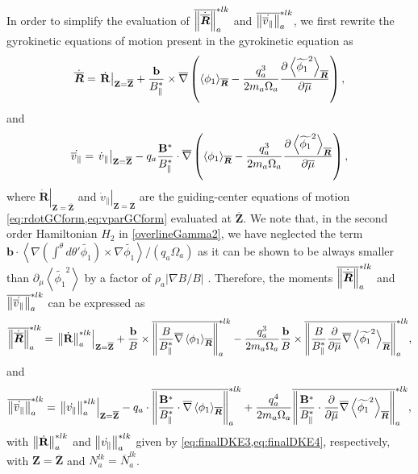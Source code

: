 In order to simplify the evaluation of ${\ovmomentstar{lk}{\dot \gyR}}$ and ${\ovmomentstar{lk}{\dot{\overline v_\parallel}}}$, we first rewrite the gyrokinetic equations of motion present in the gyrokinetic equation as
%
\begin{equation}
    \dot \gyR = \left.\dot{\mathbf R}\right|_{\mathbf Z=\overline{\mathbf Z}}+\frac{\mathbf b}{B_\parallel^*}\times \overline \nabla \left(\gyaver{ \phi_1}_{\gyR}-\frac{q_a^3}{2  m_a \Omega_a } \frac{\partial \left< \widetilde{\phi_1}^2 \right>_{\gyR}}{\partial \overline \mu}\right),
\end{equation}
%
and
%
\begin{equation}
    \dot \gyvparallel = \left.\dot v_{\parallel}\right|_{\mathbf Z=\overline{\mathbf Z}} - q_a\frac{\mathbf B^*}{B_\parallel^*}\cdot \overline \nabla  \left(\gyaver{ \phi_1}_{\gyR}-\frac{q_a^3}{2  m_a \Omega_a } \frac{\partial \left< \widetilde{\phi_1}^2 \right>_{\gyR}}{\partial \overline \mu}\right),
\end{equation}
%
where $\left.\dot{\mathbf R}\right|_{\mathbf Z=\overline{\mathbf Z}}$ and $\left.\dot v_{\parallel}\right|_{\mathbf Z=\overline{\mathbf Z}}$ are the guiding-center equations of motion \cref{eq:rdotGCform,eq:vparGCform} evaluated at $\overline{\mathbf Z}$.
%
We note that, in the second order Hamiltonian $H_2$ in \cref{overlineGamma2}, we have neglected the term 
${\bm b}\cdot\left<\nabla \left(\int^\theta d \theta'\widetilde{\phi_1}\right)\times \nabla \widetilde{\phi_1}\right>/({q_a \Omega_a})$ as it can be shown to be always smaller than ${\partial_\mu \left< \widetilde{\phi_1}^2\right>}$ by a factor of $\rho_a |\nabla B/B|$ \citep{Hahm2009}.
%
Therefore, the moments ${\ovmomentstar{lk}{\dot \gyR}}$ and ${\ovmomentstar{lk}{\dot{\overline v_\parallel}}}$ can be expressed as
%
\begin{equation}
    \ovmomentstar{lk}{\dot \gyR} = \left.\momentstar{lk}{\dot{\mathbf R}}\right|_{\mathbf Z=\overline{\mathbf Z}}+ \frac{\mathbf b}{B}\times\ovmomentstar{lk}{\frac{B}{B_\parallel^*} \overline \nabla\gyaver{ \phi_1}_{\gyR}}-\frac{q_a^3}{2  m_a \Omega_a } \frac{\mathbf b}{B}\times\ovmomentstar{lk}{\frac{B}{B_\parallel^*}\frac{\partial}{\partial \overline \mu}\overline \nabla \left< \widetilde{\phi_1}^2 \right>_{\gyR}},
\label{eq:ovrdr}
\end{equation}
%
and
%
\begin{equation}
    \ovmomentstar{lk}{\dot{\overline v_\parallel}} = \left.\momentstar{lk}{\dot{ v_\parallel}}\right|_{\mathbf Z=\overline{\mathbf Z}} - q_a\cdot \ovmomentstar{lk}{\frac{\mathbf B^*}{B_\parallel^*}\cdot\overline \nabla\gyaver{ \phi_1}_{\gyR}}+\frac{q_a^4}{2  m_a \Omega_a } \ovmomentstar{lk}{\frac{\mathbf B^*}{B_\parallel^*}\cdot \frac{\partial}{\partial \overline \mu}\overline \nabla \left< \widetilde{\phi_1}^2 \right>_{\gyR}},
    \label{eq:ovrdv}
\end{equation}
%
with $\momentstar{lk}{\dot{\mathbf R}}$ and $\momentstar{lk}{\dot{ v_\parallel}}$ given by \cref{eq:finalDKE3,eq:finalDKE4}, respectively, with $\mathbf{Z}=\overline{\mathbf{ Z}}$ and $N_a^{lk}=\overline N_a^{lk}$.

